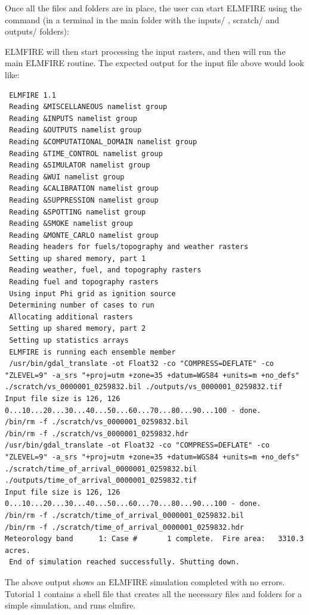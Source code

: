 Once all the files and folders are in place, the user can start ELMFIRE using the command (in a terminal in the main folder with the inputs/ , scratch/ and outputs/ folders):


ELMFIRE will then start processing the input rasters, and then will run the main ELMFIRE routine. The expected output for the input file above would look like:

\begin{verbatim}
 ELMFIRE 1.1
 Reading &MISCELLANEOUS namelist group
 Reading &INPUTS namelist group
 Reading &OUTPUTS namelist group
 Reading &COMPUTATIONAL_DOMAIN namelist group
 Reading &TIME_CONTROL namelist group
 Reading &SIMULATOR namelist group
 Reading &WUI namelist group
 Reading &CALIBRATION namelist group
 Reading &SUPPRESSION namelist group
 Reading &SPOTTING namelist group
 Reading &SMOKE namelist group
 Reading &MONTE_CARLO namelist group
 Reading headers for fuels/topography and weather rasters
 Setting up shared memory, part 1
 Reading weather, fuel, and topography rasters
 Reading fuel and topography rasters
 Using input Phi grid as ignition source
 Determining number of cases to run
 Allocating additional rasters
 Setting up shared memory, part 2
 Setting up statistics arrays
 ELMFIRE is running each ensemble member
 /usr/bin/gdal_translate -ot Float32 -co "COMPRESS=DEFLATE" -co "ZLEVEL=9" -a_srs "+proj=utm +zone=35 +datum=WGS84 +units=m +no_defs" ./scratch/vs_0000001_0259832.bil ./outputs/vs_0000001_0259832.tif
Input file size is 126, 126
0...10...20...30...40...50...60...70...80...90...100 - done.
/bin/rm -f ./scratch/vs_0000001_0259832.bil
/bin/rm -f ./scratch/vs_0000001_0259832.hdr
/usr/bin/gdal_translate -ot Float32 -co "COMPRESS=DEFLATE" -co "ZLEVEL=9" -a_srs "+proj=utm +zone=35 +datum=WGS84 +units=m +no_defs" ./scratch/time_of_arrival_0000001_0259832.bil ./outputs/time_of_arrival_0000001_0259832.tif
Input file size is 126, 126
0...10...20...30...40...50...60...70...80...90...100 - done.
/bin/rm -f ./scratch/time_of_arrival_0000001_0259832.bil
/bin/rm -f ./scratch/time_of_arrival_0000001_0259832.hdr
Meteorology band      1: Case #       1 complete.  Fire area:   3310.3 acres.
 End of simulation reached successfully. Shutting down.
\end{verbatim}
 
The above output shows an ELMFIRE simulation completed with no errors. Tutorial 1 contains a shell file that creates all the necessary files and folders for a simple simulation, and runs elmfire. 

